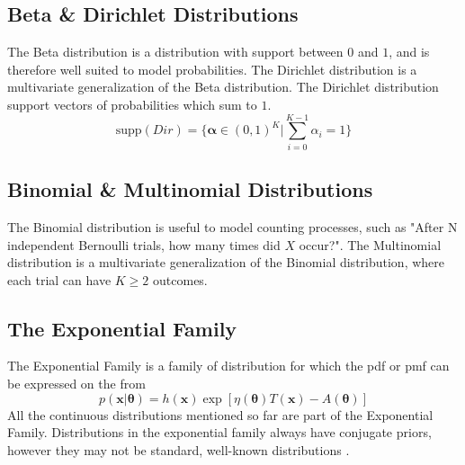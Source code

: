 \subsection{Beta \& Dirichlet Distributions}
The Beta distribution is a distribution with support between $0$ and $1$, and is therefore well suited to model probabilities. The Dirichlet distribution is a multivariate generalization of the Beta distribution. The Dirichlet distribution support vectors of probabilities which sum to $1$.
\begin{equation}
    \text{supp}(Dir) = \{\boldsymbol{\alpha} \in (0, 1)^K | \sum_{i=0}^{K-1} \alpha_i = 1\} 
\end{equation} 
\subsection{Binomial \& Multinomial Distributions}
The Binomial distribution is useful to model counting processes, such as "After N independent Bernoulli trials, how many times did $X$ occur?". The Multinomial distribution is a multivariate generalization of the Binomial distribution, where each trial can have $K \geq 2$ outcomes. 


\subsection{The Exponential Family}
The Exponential Family is a family of distribution for which the \acrshort{pdf} or \acrshort{pmf} can be expressed on the from
\begin{equation}
    p(\mathbf{x} | \boldsymbol{\theta}) = h(\mathbf{x}) \exp[\eta(\boldsymbol{\theta}) T(\mathbf{x}) - A(\boldsymbol{\theta})]
\end{equation}
All the continuous distributions mentioned so far are part of the Exponential Family. Distributions in the exponential family always have conjugate priors, however they may not be standard, well-known distributions \cite{murphy}. 

